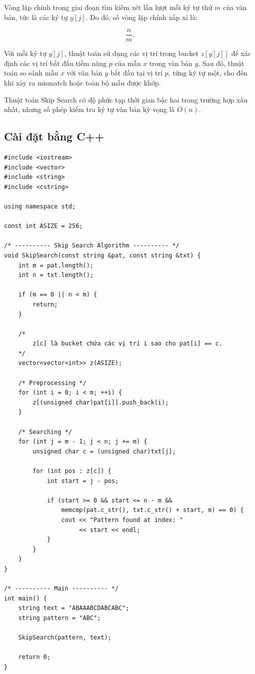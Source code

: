 Vòng lặp chính trong giai đoạn tìm kiếm xét lần lượt mỗi ký tự thứ $m$ của văn bản, tức là các ký tự $y[j]$. Do đó, số vòng lặp chính xấp xỉ là:

\[
\frac{n}{m}.
\]

Với mỗi ký tự $y[j]$, thuật toán sử dụng các vị trí trong bucket $z[y[j]]$ để xác định các vị trí bắt đầu tiềm năng $p$ của mẫu $x$ trong văn bản $y$. Sau đó, thuật toán so sánh mẫu $x$ với văn bản $y$ bắt đầu tại vị trí $p$, từng ký tự một, cho đến khi xảy ra mismatch hoặc toàn bộ mẫu được khớp.

Thuật toán Skip Search có độ phức tạp thời gian bậc hai trong trường hợp xấu nhất, nhưng số phép kiểm tra ký tự văn bản kỳ vọng là $O(n)$.

\subsection{Cài đặt bằng C++}
\begin{verbatim}
#include <iostream>
#include <vector>
#include <string>
#include <cstring>

using namespace std;

const int ASIZE = 256;

/* ---------- Skip Search Algorithm ---------- */
void SkipSearch(const string &pat, const string &txt) {
    int m = pat.length();
    int n = txt.length();

    if (m == 0 || n < m) {
        return;
    }

    /*
        z[c] là bucket chứa các vị trí i sao cho pat[i] == c.
    */
    vector<vector<int>> z(ASIZE);

    /* Preprocessing */
    for (int i = 0; i < m; ++i) {
        z[(unsigned char)pat[i]].push_back(i);
    }

    /* Searching */
    for (int j = m - 1; j < n; j += m) {
        unsigned char c = (unsigned char)txt[j];

        for (int pos : z[c]) {
            int start = j - pos;

            if (start >= 0 && start <= n - m &&
                memcmp(pat.c_str(), txt.c_str() + start, m) == 0) {
                cout << "Pattern found at index: "
                     << start << endl;
            }
        }
    }
}

/* ---------- Main ---------- */
int main() {
    string text = "ABAAABCDABCABC";
    string pattern = "ABC";

    SkipSearch(pattern, text);

    return 0;
}
\end{verbatim}

